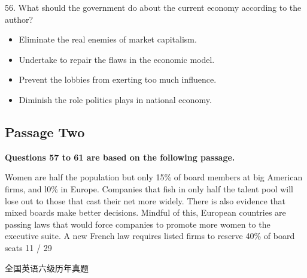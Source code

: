 \documentclass[UTF8,11pt]{ctexart}
\begin{document}
56. What should the government do about the current economy according to the author?


\begin{itemize}[leftmargin=2em,itemsep=.2em,topsep=.4em]\item[A.] Eliminate the real enemies of market capitalism.
\item[B.] Undertake to repair the flaws in the economic model.
\item[C.] Prevent the lobbies from exerting too much influence.
\item[D.] Diminish the role politics plays in national economy.
\end{itemize}

\subsection*{\textbf{Passage Two}}


\textbf{Questions 57 to 61 are based on the following passage.}


Women are half the population but only 15\% of board members at big American firms, and l0\% in Europe. Companies that fish in only half the talent pool will lose out to those that cast their net more widely. There is also evidence that mixed boards make better decisions. Mindful of this, European countries are passing laws that would force companies to promote more women to the executive suite. A new French law requires listed firms to reserve 40\% of board seats 11 / 29


全国英语六级历年真题
\end{document}
